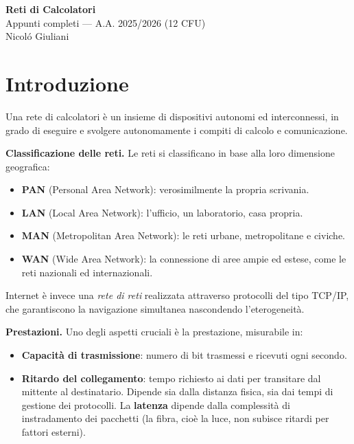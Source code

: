 \documentclass[11pt,a4paper]{report}
\newcommand{\pagemark}[1]{\marginpar{\footnotesize\color{gray}p.#1}}
\begin{document}
\begin{titlepage}\centering\vspace*{3cm}
{\Huge\bfseries\color{acc} Reti di Calcolatori}\\[6pt]
{\Large Appunti completi — A.A. 2025/2026 (12 CFU)}\\[18pt]
\vfill {\small Nicol\'o Giuliani}\\\end{titlepage}
\tableofcontents
\clearpage

\chapter{Introduzione}\pagemark{2}
Una rete di calcolatori è un insieme di dispositivi autonomi ed interconnessi, in grado di eseguire e svolgere autonomamente i compiti di calcolo e comunicazione.

\textbf{Classificazione delle reti.} Le reti si classificano in base alla loro dimensione geografica:
\begin{itemize}
\item \textbf{PAN} (Personal Area Network): verosimilmente la propria scrivania.
\item \textbf{LAN} (Local Area Network): l'ufficio, un laboratorio, casa propria.
\item \textbf{MAN} (Metropolitan Area Network): le reti urbane, metropolitane e civiche.
\item \textbf{WAN} (Wide Area Network): la connessione di aree ampie ed estese, come le reti nazionali ed internazionali.
\end{itemize}
Internet è invece una \emph{rete di reti} realizzata attraverso protocolli del tipo TCP/IP, che garantiscono la navigazione simultanea nascondendo l'eterogeneità.

\textbf{Prestazioni.} Uno degli aspetti cruciali è la prestazione, misurabile in:
\begin{itemize}
\item \textbf{Capacità di trasmissione}: numero di bit trasmessi e ricevuti ogni secondo.
\item \textbf{Ritardo del collegamento}: tempo richiesto ai dati per transitare dal mittente al destinatario. Dipende sia dalla distanza fisica, sia dai tempi di gestione dei protocolli. La \textbf{latenza} dipende dalla complessità di instradamento dei pacchetti (la fibra, cioè la luce, non subisce ritardi per fattori esterni).
\end{itemize}
\end{document}
